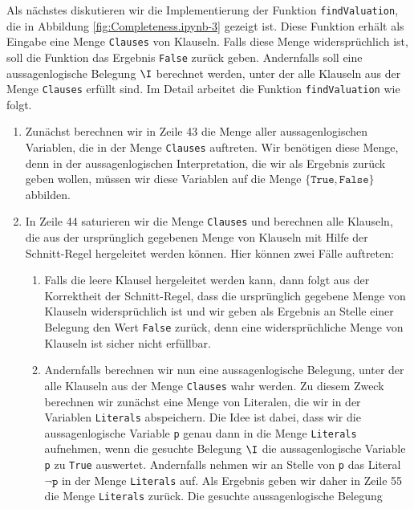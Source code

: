 Als nächstes diskutieren wir die Implementierung der Funktion \texttt{findValuation}, die in
Abbildung \ref{fig:Completeness.ipynb-3} gezeigt ist.  Diese Funktion erhält als Eingabe eine Menge
\texttt{Clauses} von Klauseln.  Falls diese Menge widersprüchlich ist, soll die Funktion
das Ergebnis \texttt{False} zurück geben.  Andernfalls soll eine aussagenlogische Belegung $\I$ berechnet werden,
unter der alle Klauseln aus der Menge \texttt{Clauses} erfüllt sind.
Im Detail arbeitet die Funktion \texttt{findValuation} wie folgt.
\begin{enumerate}
\item Zunächst berechnen wir in Zeile 43 die Menge aller aussagenlogischen Variablen, die in der Menge
      \texttt{Clauses} auftreten.  Wir benötigen diese Menge, denn in der
      aussagenlogischen Interpretation, die wir als Ergebnis zurück geben wollen, müssen 
      wir diese Variablen auf die Menge $\{ \texttt{True}, \texttt{False} \}$ abbilden.       
\item In Zeile 44 saturieren wir die Menge \texttt{Clauses} und berechnen alle Klauseln, die aus der
      ursprünglich gegebenen Menge von Klauseln mit Hilfe der Schnitt-Regel hergeleitet werden
      können.  Hier können zwei Fälle auftreten:
      \begin{enumerate}
      \item Falls die leere Klausel hergeleitet werden kann, dann folgt aus der Korrektheit der Schnitt-Regel,
            dass die ursprünglich gegebene Menge von Klauseln widersprüchlich ist und wir geben als Ergebnis an
            Stelle einer Belegung den Wert \texttt{False} zurück, denn eine widersprüchliche Menge von Klauseln
            ist sicher nicht erfüllbar.
      \item Andernfalls berechnen wir nun eine aussagenlogische Belegung, unter der alle Klauseln aus
            der Menge \texttt{Clauses} wahr werden.  Zu diesem Zweck berechnen wir zunächst eine Menge von
            Literalen, die wir in der Variablen \texttt{Literals} abspeichern.  Die Idee ist dabei, dass wir
            die aussagenlogische Variable \texttt{p} genau dann in die Menge \texttt{Literals} aufnehmen, wenn
            die gesuchte Belegung $\I$ die aussagenlogische
            Variable \texttt{p} zu \texttt{True} auswertet.  Andernfalls nehmen wir an Stelle von \texttt{p} das
            Literal $\neg \texttt{p}$ in der Menge \texttt{Literals} auf.  Als Ergebnis geben wir daher in
            Zeile 55 die Menge \texttt{Literals} zurück.  Die gesuchte aussagenlogische Belegung

\end{enumerate}
\end{enumerate}
